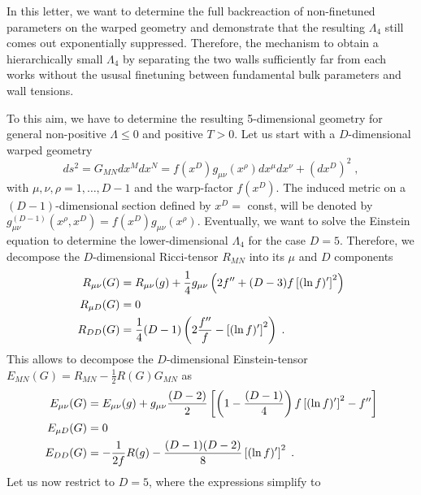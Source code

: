\documentclass[a4paper,12pt]{article}
\begin{document}
In this letter, we want to determine the full backreaction of
non-finetuned parameters on the warped geometry and demonstrate that
the resulting $\Lambda_4$ still comes out exponentially
suppressed. Therefore, the mechanism to obtain a hierarchically small
$\Lambda_4$ by separating the two walls sufficiently far from each
works without the ususal finetuning between fundamental bulk
parameters and wall tensions.

To this aim, we have to determine the resulting 5-dimensional geometry for
general non-positive $\Lambda \le 0$ and positive $T>0$.
Let us start with a $D$-dimensional warped geometry
\begin{equation}
  ds^2=G_{MN}dx^M dx^N=f(x^D)g_{\mu\nu}(x^\rho)dx^\mu dx^\nu + (dx^D)^2 \; ,
\end{equation}
with $\mu,\nu,\rho=1,\hdots,D-1$ and the warp-factor
$f(x^D)$. The induced metric on a $(D-1)$-dimensional section defined by
$x^D=$ const, will be denoted by $g^{(D-1)}_{\mu\nu}(x^\rho,x^D)
=f(x^D)g_{\mu\nu}(x^\rho)$. Eventually, we want to solve the Einstein equation
to determine the lower-dimensional $\Lambda_4$
for the case $D=5$. Therefore, we decompose the $D$-dimensional Ricci-tensor
$R_{MN}$ into its $\mu$ and $D$ components
\begin{alignat}{3}
  R_{\mu\nu}(G) &= R_{\mu\nu}(g)+\frac{1}{4}g_{\mu\nu}
            \left( 2f^{\prime\prime}+(D-3)f\left[(\ln f)^\prime\right]^2 
            \right) \notag \\
  R_{\mu D}(G) &= 0 \\
  R_{DD}(G) &= \frac{1}{4}(D-1)\left( 2\frac{f^{\prime\prime}}{f}
                                    - \left[(\ln f)^\prime\right]^2
                               \right) \; . \notag                                   
\end{alignat}
This allows to decompose the $D$-dimensional Einstein-tensor
$E_{MN}(G)=R_{MN}-\frac{1}{2}R(G) G_{MN}$ as
\begin{alignat}{3}
  E_{\mu\nu}(G) &= E_{\mu\nu}(g)+g_{\mu\nu}\frac{(D-2)}{2}
                   \left[ \left(1-\frac{(D-1)}{4}\right) 
                          f\left[(\ln f)^\prime\right]^2
                         -f^{\prime\prime}
                   \right] \notag \\
  E_{\mu D}(G) &= 0 \\
  E_{DD}(G) &= -\frac{1}{2f}R(g)
               -\frac{(D-1)(D-2)}{8}
                \left[(\ln f)^\prime\right]^2 \; . \notag
\end{alignat}
Let us now restrict to $D=5$, where the expressions simplify to
\end{document}
